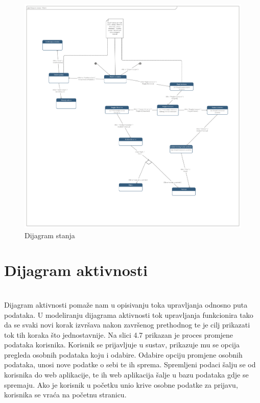 		\begin{figure}[H]
			\hspace*{-1.5cm}
			\includegraphics[scale=0.13]{dijagrami/Dijagram stanja (1).png} %
			\centering
			\caption{Dijagram stanja}
			\label{fig:promjene}
		\end{figure}
			
			
			\eject 
		
		\section{Dijagram aktivnosti}
			
			\textbf{}\\
            Dijagram aktivnosti pomaže nam u opisivanju toka upravljanja odnosno puta podataka. U modeliranju dijagrama aktivnosti tok upravljanja funkcionira tako da se svaki novi korak izvršava nakon završenog prethodnog te je cilj  prikazati tok tih koraka što jednostavnije. Na slici 4.7 prikazan je proces promjene podataka korisnika. Korisnik se prijavljuje u sustav, prikazuje mu se opcija pregleda osobnih podataka koju i odabire. Odabire opciju promjene osobnih podataka, unosi nove podatke o sebi te ih sprema. Spremljeni podaci šalju se od korisnika do web aplikacije, te ih web aplikacija šalje u bazu podataka gdje se spremaju. Ako je korisnik u početku unio krive osobne podatke za prijavu, korisnika se vraća na početnu stranicu.
			 
